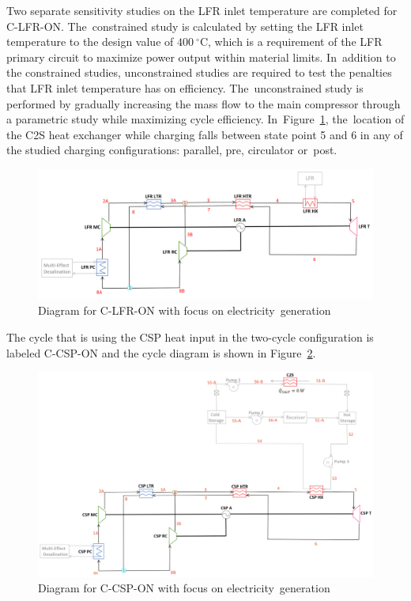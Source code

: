 \documentclass[sustainability,article,accept,moreauthors,pdftex]{Definitions/mdpi}
\begin{document}
\begin{paracol}{2}
Two separate sensitivity studies on the LFR inlet temperature are completed for C-LFR-ON. The~constrained study is calculated by setting the LFR inlet temperature to the design value of $400~^{\circ}$C, which is a requirement of the LFR primary circuit to maximize power output within material limits. In~addition to the constrained studies, unconstrained studies are required to test the penalties that LFR inlet temperature has on efficiency. The~unconstrained study is performed by gradually increasing the mass flow to the main compressor through a parametric study while maximizing cycle efficiency. In~Figure~\ref{c-lfr-on}, the~location of the C2S heat exchanger while charging falls between state point 5 and 6 in any of the studied charging configurations: parallel, pre, circulator or~post. 

\begin{figure}[H] 
   \widefigure
    \includegraphics[width=\linewidth]{Definitions/c-lfr-on.pdf}
    \caption{Diagram for C-LFR-ON with focus on electricity~generation\label{c-lfr-on}}
\end{figure}

The cycle that is using the CSP heat input in the two-cycle configuration is labeled C-CSP-ON and the cycle diagram is shown in Figure~\ref{c-csp-on}. 

\end{paracol}
\begin{figure}[H] 
    \widefigure
    \includegraphics[width=\linewidth]{Definitions/c-csp-on.pdf}
    \caption{Diagram for C-CSP-ON with focus on electricity~generation\label{c-csp-on}}
\end{figure}
\end{document}
